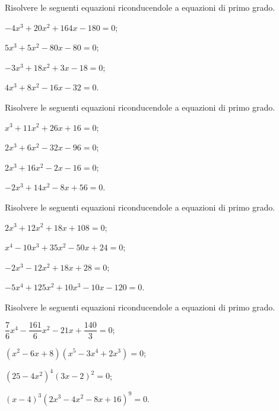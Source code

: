 \begin{esercizio}[\Ast]
\label{ese:17.7}
Risolvere le seguenti equazioni riconducendole a equazioni di primo grado.
\begin{multicols}{2}
\begin{enumeratea}
\spazielenx
 \item $-4x^{3}+20x^{2}+164x-180=0$;
 \item $5x^{3}+5x^{2}-80x-80=0$;
 \item $-3x^{3}+18x^{2}+3x-18=0$;
 \item $4x^{3}+8x^{2}-16x-32=0$.
\end{enumeratea}
\end{multicols}
\end{esercizio}
\pagebreak
\begin{esercizio}[\Ast]
\label{ese:17.8}
Risolvere le seguenti equazioni riconducendole a equazioni di primo grado.
\begin{multicols}{2}
\begin{enumeratea}
 \item $x^{3}+11x^{2}+26x+16=0$;
 \item $2x^{3}+6x^{2}-32x-96=0$;
 \item $2x^{3}+16x^{2}-2x-16=0$;
 \item $-2x^{3}+14x^{2}-8x+56=0$.
\end{enumeratea}
\end{multicols}
\end{esercizio}

\begin{esercizio}[\Ast]
\label{ese:17.9}
Risolvere le seguenti equazioni riconducendole a equazioni di primo grado.
\begin{multicols}{2}
\begin{enumeratea}
 \item $2x^{3}+12x^{2}+18x+108=0$;
 \item $x^{4}-10x^{3}+35x^{2}-50x+24=0$;
 \item $-2x^{3}-12x^{2}+18x+28=0$;
 \item $-5x^{4}+125x^{2}+10x^{3}-10x-120=0$.
\end{enumeratea}
\end{multicols}
\end{esercizio}

\begin{esercizio}[\Ast]
\label{ese:17.10}
Risolvere le seguenti equazioni riconducendole a equazioni di primo grado.
\begin{multicols}{2}
\begin{enumeratea}
 \item $\dfrac{7}{6}x^{4}-\dfrac{161}{6}x^{2}-21x+\dfrac{140}{3}=0$;
 \item $(x^{2}-6x+8)(x^{5}-3x^{4}+2x^{3})=0$;
 \item $\left(25-4x^{2}\right)^{4}\left(3x-2\right)^{2}=0$;
 \item $(x-4)^{3}\left(2x^{3}-4x^{2}-8x+16\right)^{9}=0$.
\end{enumeratea}
\end{multicols}
\end{esercizio}


